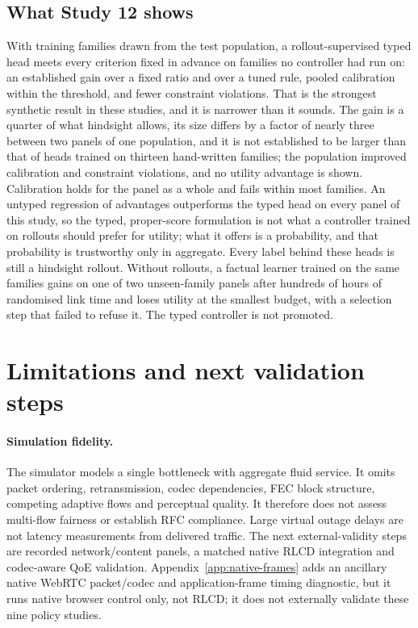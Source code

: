 \documentclass[10pt]{article}
\begin{document}
\subsection{What Study 12 shows}
With training families drawn from the test population, a rollout-supervised typed head meets every criterion fixed in advance on families no controller had run on: an established gain over a fixed ratio and over a tuned rule, pooled calibration within the threshold, and fewer constraint violations. That is the strongest synthetic result in these studies, and it is narrower than it sounds. The gain is a quarter of what hindsight allows, its size differs by a factor of nearly three between two panels of one population, and it is not established to be larger than that of heads trained on thirteen hand-written families; the population improved calibration and constraint violations, and no utility advantage is shown. Calibration holds for the panel as a whole and fails within most families. An untyped regression of advantages outperforms the typed head on every panel of this study, so the typed, proper-score formulation is not what a controller trained on rollouts should prefer for utility; what it offers is a probability, and that probability is trustworthy only in aggregate. Every label behind these heads is still a hindsight rollout. Without rollouts, a factual learner trained on the same families gains on one of two unseen-family panels after hundreds of hours of randomised link time and loses utility at the smallest budget, with a selection step that failed to refuse it. The typed controller is not promoted.


\section{Limitations and next validation steps}
\paragraph{Simulation fidelity.}
The simulator models a single bottleneck with aggregate fluid service. It omits packet ordering, retransmission, codec dependencies, FEC block structure, competing adaptive flows and perceptual quality. It therefore does not assess multi-flow fairness or establish RFC compliance. Large virtual outage delays are not latency measurements from delivered traffic. The next external-validity steps are recorded network/content panels, a matched native RLCD integration and codec-aware QoE validation. Appendix~\ref{app:native-frames} adds an ancillary native WebRTC packet/codec and application-frame timing diagnostic, but it runs native browser control only, not RLCD; it does not externally validate these nine policy studies.
\end{document}
